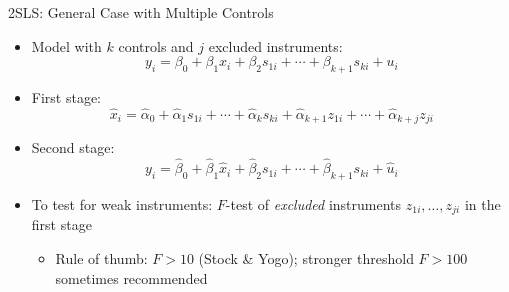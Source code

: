 \documentclass[9pt]{beamer}
\begin{document}
\begin{frame}{2SLS: General Case with Multiple Controls}
  \begin{itemize}
    \item Model with $k$ controls and $j$ excluded instruments:
    \[
      y_i = \beta_0 + \beta_1 x_i + \beta_2 s_{1i} + \cdots + \beta_{k+1}s_{ki} + u_i
    \]
    \item First stage:
    \[
      \hat{x}_i = \hat{\alpha}_0 + \hat{\alpha}_1 s_{1i} + \cdots + \hat{\alpha}_k s_{ki}
               + \hat{\alpha}_{k+1}z_{1i} + \cdots + \hat{\alpha}_{k+j}z_{ji}
    \]
    \item Second stage:
    \[
      y_i = \hat{\beta}_0 + \hat{\beta}_1\hat{x}_i + \hat{\beta}_2 s_{1i} + \cdots
          + \hat{\beta}_{k+1}s_{ki} + \hat{u}_i
    \]
    \medskip
    \item To test for weak instruments: $F$-test of \emph{excluded} instruments $z_{1i},\ldots,z_{ji}$ in the first stage
    \begin{itemize}
      \item[$\blacktriangleright$] Rule of thumb: $F > 10$ (Stock \& Yogo); stronger threshold $F > 100$ sometimes recommended
    \end{itemize}
  \end{itemize}
\end{frame}
\end{document}

